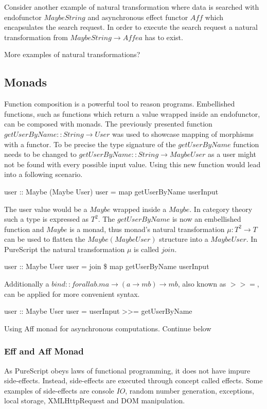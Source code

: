 \documentclass[article]{aaltoseries}
\begin{document}
    Consider another example of natural transformation where data is searched
    with endofunctor $Maybe String$ and asynchronous effect functor $Aff$ which
    encapsulates the search request. In order to execute the search request a
    natural transformation from $Maybe String \rightarrow Aff e a$ has to exist.

More examples of natural transformations?


  \subsection{Monads}
    Function composition is a powerful tool to reason programs. Embellished
    functions, such as functions which return a value wrapped inside an
    endofunctor, can be composed with monads. The previously presented function
    $getUserByName :: String \rightarrow User$ was used to showcase mapping of morphisms
    with a functor. To be precise the type signature of the $getUserByName$
    function needs to be changed to $getUserByName :: String \rightarrow Maybe User$ as a
    user might not be found with every possible input value. Using this new
    function would lead into a following scenario.
 
    user :: Maybe (Maybe User)
    user = map getUserByName userInput
 
    The user value would be a $Maybe$ wrapped inside a $Maybe$. In category theory such
    a type is expressed as $T^2$. The $getUserByName$ is now an embellished function and
    $Maybe$ is a monad, thus monad’s natural transformation $\mu : T^2 \rightarrow T$ can be used to
    flatten the $Maybe (Maybe User)$ structure into a $Maybe User$. In PureScript the
    natural transformation $\mu$ is called $join$.
 
    user :: Maybe User
    user = join \$ map getUserByName userInput
 
    Additionally a $bind :: forall a b. m a \rightarrow (a \rightarrow m b)
    \rightarrow m b$, also known as $>>=$, can be applied for more convenient syntax.
 
    user :: Maybe User
    user = userInput >>= getUserByName
 
    Using Aff monad for asynchronous computations. Continue below


    \subsubsection{Eff and Aff Monad}
      As PureScript obeys laws of functional programming, it does not have
      impure side-effects. Instead, side-effects are executed through concept
      called effects. Some examples of side-effects are console $IO$, random
      number generation, exceptions, local storage, XMLHttpRequest and DOM
      manipulation.
\end{document}

